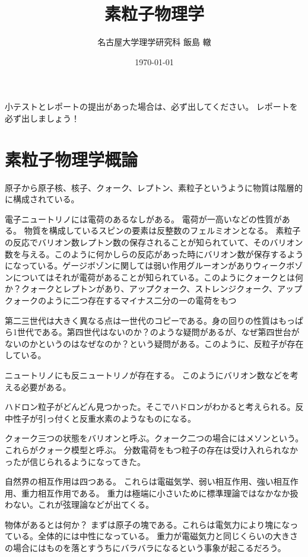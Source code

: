 \documentclass[titlepage]{ltjsarticle}
\begin{document}
\title{素粒子物理学}
\author{名古屋大学理学研究科 飯島 轍}
\date{\today}
\maketitle


小テストとレポートの提出があった場合は、必ず出してください。
レポートを必ず出しましょう！

\section{素粒子物理学概論}

原子から原子核、核子、クォーク、レプトン、素粒子というように物質は階層的に構成されている。

電子ニュートリノには電荷のあるなしがある。
電荷が一高いなどの性質がある。
物質を構成しているスピンの要素は反整数のフェルミオンとなる。
素粒子の反応でバリオン数レプトン数の保存されることが知られていて、そのバリオン数を与える。このように何かしらの反応があった時にバリオン数が保存するようになっている。ゲージボゾンに関しては弱い作用グルーオンがありウィークボゾンについてはそれが電荷があることが知られている。このようにクォークとは何か？クォークとレプトンがあり、アップクォーク、ストレンジクォーク、アップクォークのように二つ存在するマイナス二分の一の電荷をもつ


第二三世代は大きく異なる点は一世代のコピーである。身の回りの性質はもっぱら1世代である。第四世代はないのか？のような疑問があるが、なぜ第四世台がないのかというのはなぜなのか？という疑問がある。このように、反粒子が存在している。

ニュートリノにも反ニュートリノが存在する。
このようにバリオン数などを考える必要がある。


ハドロン粒子がどんどん見つかった。そこでハドロンがわかると考えられる。反中性子が引っ付くと反重水素のようなものになる。

クォーク三つの状態をバリオンと呼ぶ。クォーク二つの場合にはメソンという。
これらがクォーク模型と呼ぶ。
分数電荷をもつ粒子の存在は受け入れられなかったが信じられるようになってきた。

自然界の相互作用は四つある。
これらは電磁気学、弱い相互作用、強い相互作用、重力相互作用である。
重力は極端に小さいために標準理論ではなかなか扱わない。これが弦理論などが出てくる。

物体があるとは何か？
まずは原子の塊である。これらは電気力により塊になっている。全体的には中性になっている。
重力が電磁気力と同じくらいの大きさの場合にはものを落とすうちにバラバラになるという事象が起こるだろう。
\end{document}
